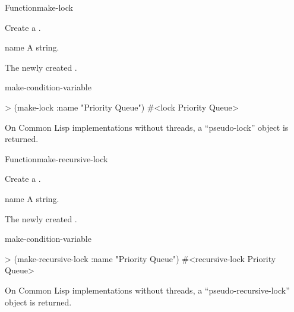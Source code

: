 \documentclass[10pt,twoside,english,pdftex]{article}
\begin{document}

\begin{functiondoc}{Function}{make-lock}{ 
    \returns{} } 
%
%
%

\fnsyntax

\fnpurpose Create a .

\fnpackage {}

\fnmodule {}

\fnargs
\begin{args}{name}
\arg[name] A string.
\end{args}

\fnreturns The newly created . 

\begin{alsos}{make-condition-variable}
\end{alsos}

\fnexample
\begin{example}
> (make-lock :name "Priority Queue")
#<lock Priority Queue>
\end{example}

\fnnotes On Common Lisp implementations without threads, a
``pseudo-lock'' object is returned.

\end{functiondoc}


\begin{functiondoc}{Function}{make-recursive-lock}{ 
    \returns{} } 
%
%
%

\fnsyntax

\fnpurpose Create a .

\fnpackage {}

\fnmodule {}

\fnargs
\begin{args}{name}
\arg[name] A string.
\end{args}

\fnreturns The newly created . 

\begin{alsos}{make-condition-variable}
\end{alsos}

\fnexample
\begin{example}
> (make-recursive-lock :name "Priority Queue")
#<recursive-lock Priority Queue>
\end{example}

\fnnotes On Common Lisp implementations without threads, a
``pseudo-recursive-lock'' object is returned.

\end{functiondoc}
\end{document}
